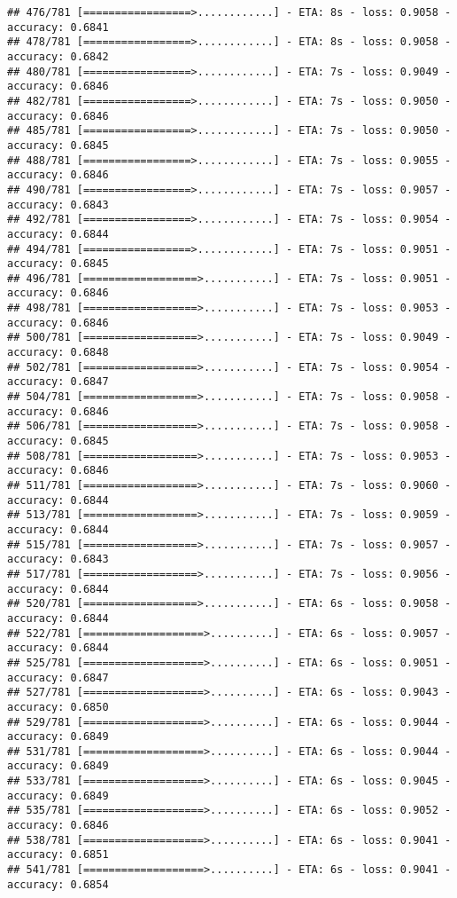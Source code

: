 \documentclass[
]{article}
\begin{document}
\begin{verbatim}
## 476/781 [=================>............] - ETA: 8s - loss: 0.9058 - accuracy: 0.6841
## 478/781 [=================>............] - ETA: 8s - loss: 0.9058 - accuracy: 0.6842
## 480/781 [=================>............] - ETA: 7s - loss: 0.9049 - accuracy: 0.6846
## 482/781 [=================>............] - ETA: 7s - loss: 0.9050 - accuracy: 0.6846
## 485/781 [=================>............] - ETA: 7s - loss: 0.9050 - accuracy: 0.6845
## 488/781 [=================>............] - ETA: 7s - loss: 0.9055 - accuracy: 0.6846
## 490/781 [=================>............] - ETA: 7s - loss: 0.9057 - accuracy: 0.6843
## 492/781 [=================>............] - ETA: 7s - loss: 0.9054 - accuracy: 0.6844
## 494/781 [=================>............] - ETA: 7s - loss: 0.9051 - accuracy: 0.6845
## 496/781 [==================>...........] - ETA: 7s - loss: 0.9051 - accuracy: 0.6846
## 498/781 [==================>...........] - ETA: 7s - loss: 0.9053 - accuracy: 0.6846
## 500/781 [==================>...........] - ETA: 7s - loss: 0.9049 - accuracy: 0.6848
## 502/781 [==================>...........] - ETA: 7s - loss: 0.9054 - accuracy: 0.6847
## 504/781 [==================>...........] - ETA: 7s - loss: 0.9058 - accuracy: 0.6846
## 506/781 [==================>...........] - ETA: 7s - loss: 0.9058 - accuracy: 0.6845
## 508/781 [==================>...........] - ETA: 7s - loss: 0.9053 - accuracy: 0.6846
## 511/781 [==================>...........] - ETA: 7s - loss: 0.9060 - accuracy: 0.6844
## 513/781 [==================>...........] - ETA: 7s - loss: 0.9059 - accuracy: 0.6844
## 515/781 [==================>...........] - ETA: 7s - loss: 0.9057 - accuracy: 0.6843
## 517/781 [==================>...........] - ETA: 7s - loss: 0.9056 - accuracy: 0.6844
## 520/781 [==================>...........] - ETA: 6s - loss: 0.9058 - accuracy: 0.6844
## 522/781 [===================>..........] - ETA: 6s - loss: 0.9057 - accuracy: 0.6844
## 525/781 [===================>..........] - ETA: 6s - loss: 0.9051 - accuracy: 0.6847
## 527/781 [===================>..........] - ETA: 6s - loss: 0.9043 - accuracy: 0.6850
## 529/781 [===================>..........] - ETA: 6s - loss: 0.9044 - accuracy: 0.6849
## 531/781 [===================>..........] - ETA: 6s - loss: 0.9044 - accuracy: 0.6849
## 533/781 [===================>..........] - ETA: 6s - loss: 0.9045 - accuracy: 0.6849
## 535/781 [===================>..........] - ETA: 6s - loss: 0.9052 - accuracy: 0.6846
## 538/781 [===================>..........] - ETA: 6s - loss: 0.9041 - accuracy: 0.6851
## 541/781 [===================>..........] - ETA: 6s - loss: 0.9041 - accuracy: 0.6854

\end{verbatim}
\end{document}

